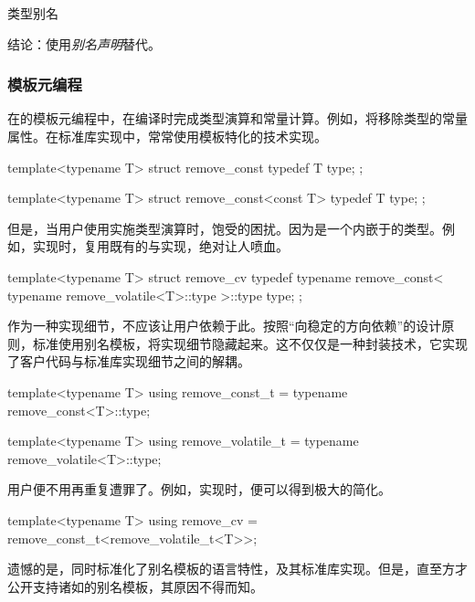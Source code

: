 \begin{content}
\begin{episode}{类型别名}
\begin{content}
结论：使用\emph{别名声明}替代。

\subsubsection{模板元编程}

在\cpp{}的模板元编程中，在编译时完成类型演算和常量计算。例如，将移除类型的常量属性。在标准库实现中，常常使用模板特化的技术实现。

\begin{c++}[title={\ttfamily{类型演算：remvoe\_const实现}}]
template<typename T>
struct remove_const { 
  typedef T type; 
};

template<typename T>
struct remove_const<const T> { 
  typedef T type; 
};
\end{c++}

但是，当用户使用实施类型演算时，饱受的困扰。因为是一个内嵌于的类型。例如，实现时，复用既有的与实现，绝对让人喷血。

\begin{c++}[title={\ttfamily{类型演算：remvoe\_cv实现，复用remove\_const与remove\_volatile}}]
template<typename T>
struct remove_cv {
  typedef typename remove_const<
    typename remove_volatile<T>::type
  >::type type;
};
\end{c++}

作为一种实现细节，不应该让用户依赖于此。按照“向稳定的方向依赖”的设计原则，标准使用别名模板，将实现细节隐藏起来。这不仅仅是一种封装技术，它实现了客户代码与标准库实现细节之间的解耦。

\begin{c++}[title={\ttfamily{C++14: 别名模板}}]
template<typename T>
using remove_const_t = typename remove_const<T>::type;

template<typename T>
using remove_volatile_t = typename remove_volatile<T>::type;
\end{c++}

用户便不用再重复遭罪了。例如，实现时，便可以得到极大的简化。

\begin{c++}[title={\ttfamily{改善remove\_cv： 复用实现}}]
template<typename T>
using remove_cv = remove_const_t<remove_volatile_t<T>>;
\end{c++}

遗憾的是，同时标准化了别名模板的语言特性，及其标准库实现。但是，直至方才公开支持诸如的别名模板，其原因不得而知。


\end{content}
\end{episode}
\end{content}
